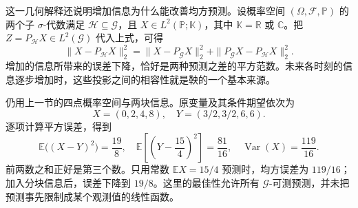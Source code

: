 这一几何解释还说明增加信息为什么能改善均方预测。设概率空间 \((\Omega,\mathcal F,\mathbb P)\) 的两个子 \(\sigma\)-代数满足 \(\mathcal H\subseteq\mathcal G\)，且 \(X\in L^2(\mathbb P;\mathbb K)\)，其中 \(\mathbb K=\mathbb R\) 或 \(\mathbb C\)。把 \(Z=P_{\mathcal H}X\in L^2(\mathcal G)\) 代入上式，可得
\[
 \|X-P_{\mathcal H}X\|_2^2
 =\|X-P_{\mathcal G}X\|_2^2
  +\|P_{\mathcal G}X-P_{\mathcal H}X\|_2^2.
\]
增加的信息所带来的误差下降，恰好是两种预测之差的平方范数。未来各时刻的信息逐步增加时，这些投影之间的相容性就是鞅的一个基本来源。

\ProseParagraphBreak

仍用上一节的四点概率空间与两块信息。原变量及其条件期望依次为
\[
 X=(0,2,4,8),\quad Y=(3/2,3/2,6,6).
\]
逐项计算平方误差，得到
\[
 \mathbb E\bigl((X-Y)^2\bigr)=\frac{19}{8},\quad
 \mathbb E\left[\left(Y-\frac{15}{4}\right)^2\right]=\frac{81}{16},\quad
 \operatorname{Var}(X)=\frac{119}{16}.
\]
前两数之和正好是第三个数。只用常数 \(\mathbb E X=15/4\) 预测时，均方误差为 \(119/16\)；加入分块信息后，误差下降到 \(19/8\)。这里的最佳性允许所有 \(\mathcal G\)-可测预测，并未把预测事先限制成某个观测值的线性函数。
